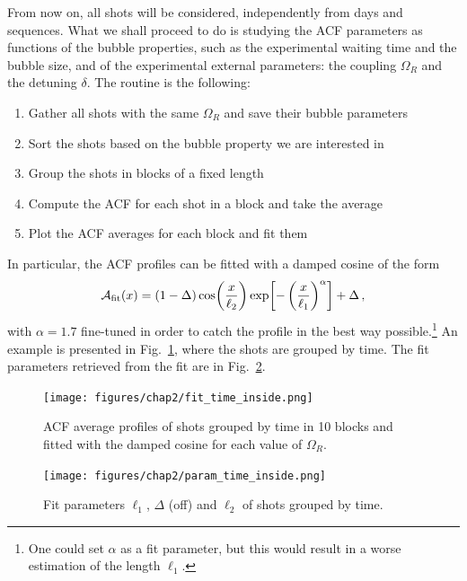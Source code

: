 From now on, all shots will be considered, independently from days and sequences. What we shall proceed to do is studying the ACF parameters as functions of the bubble properties, such as the experimental waiting time and the bubble size, and of the experimental external parameters: the coupling $\Omega_R$ and the detuning $\delta$. 
The routine is the following:
\begin{enumerate}
    \item Gather all shots with the same $\Omega_R$ and save their bubble parameters
    \item Sort the shots based on the bubble property we are interested in
    \item Group the shots in blocks of a fixed length
    \item Compute the ACF for each shot in a block and take the average
    \item Plot the ACF averages for each block and fit them
\end{enumerate}
In particular, the ACF profiles can be fitted with a damped cosine of the form
\begin{equation*}
    \mathcal{A}_{\rm fit}(x) = (1 - \Delta)\cos(\frac{x}{\ell_2})\exp[-\left(\frac{x}{\ell_1}\right)^\alpha] + \Delta\, ,
\end{equation*}
with $\alpha = 1.7$ fine-tuned in order to catch the profile in the best way possible.\footnote{One could set $\alpha$ as a fit parameter, but this would result in a worse estimation of the length $\ell_1$.} An example is presented in Fig.\ \ref{fig:fit_time_inside}, where the shots are grouped by time. The fit parameters retrieved from the fit are in Fig.\ \ref{fig:param_time_inside}.

\begin{figure}
    \centering
    \texttt{[image: figures/chap2/fit\_time\_inside.png]}
    \caption{ACF average profiles of shots grouped by time in 10 blocks and fitted with the damped cosine for each value of $\Omega_R$.}
    \label{fig:fit_time_inside}
\end{figure}
\begin{figure}
    \centering
    \texttt{[image: figures/chap2/param\_time\_inside.png]}
    \caption{Fit parameters $\ell_1$, $\Delta$ (off) and $\ell_2$ of shots grouped by time.}
    \label{fig:param_time_inside}
\end{figure}

